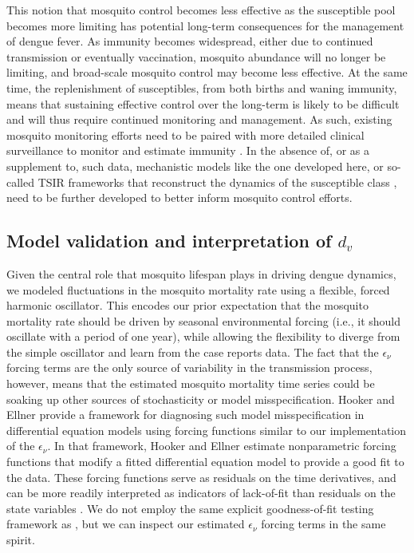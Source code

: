 \documentclass[10pt,letterpaper]{article}
\begin{document}
This notion that mosquito control becomes less effective as the susceptible pool becomes more limiting has potential long-term consequences for the management of dengue fever.
As immunity becomes widespread, either due to continued transmission or eventually vaccination, mosquito abundance will no longer be limiting, and broad-scale mosquito control may become less effective.
At the same time, the replenishment of susceptibles, from both births and waning immunity, means that sustaining effective control over the long-term is likely to be difficult \cite{Scott2010b} and will thus require continued monitoring and management.
As such, existing mosquito monitoring efforts need to be paired with more detailed clinical surveillance to monitor and estimate immunity \cite{Morrison2008}.
In the absence of, or as a supplement to, such data, mechanistic models like the one developed here, or so-called TSIR frameworks that reconstruct the dynamics of the susceptible class \cite{Finkenstadt2000, Reich2013}, need to be further developed to better inform mosquito control efforts.

\subsection*{Model validation and interpretation of $d_v$}

Given the central role that mosquito lifespan plays in driving dengue dynamics, we modeled fluctuations in the mosquito mortality rate using a flexible, forced harmonic oscillator.
This encodes our prior expectation that the mosquito mortality rate should be driven by seasonal environmental forcing (i.e., it should oscillate with a period of one year), while allowing the flexibility to diverge from the simple oscillator and learn from the case reports data.
The fact that the $\epsilon_{\nu}$ forcing terms are the only source of variability in the transmission process, however, means that the estimated mosquito mortality time series could be soaking up other sources of stochasticity or model misspecification.
Hooker and Ellner \cite{Hooker2015} provide a framework for diagnosing such model misspecification in differential equation models using forcing functions similar to our implementation of the $\epsilon_{\nu}$.
In that framework, Hooker and Ellner \cite{Hooker2015} estimate nonparametric forcing functions that modify a fitted differential equation model to provide a good fit to the data.
These forcing functions serve as residuals on the time derivatives, and can be more readily interpreted as indicators of lack-of-fit than residuals on the state variables \cite{Hotelling1927, Hooker2015}.
We do not employ the same explicit goodness-of-fit testing framework as \cite{Hooker2015}, but we can inspect our estimated $\epsilon_{\nu}$ forcing terms in the same spirit.
\end{document}
